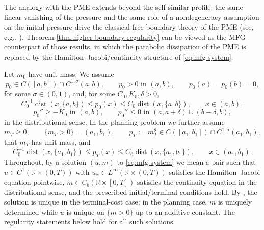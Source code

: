 \documentclass[11pt]{amsart}
\newcommand{\R}{\mathbb R}
\begin{document}
The analogy with the PME extends beyond the self-similar profile: the
same linear vanishing of the pressure and the same role of a nondegeneracy
assumption on the initial pressure drive the classical free boundary
theory of the PME (see, e.g., \cite{CF79,DH98,KKV18,Vazquez}). Theorem
\ref{thm:higher-boundary-regularity} can be viewed as the MFG
counterpart of those results, in which the parabolic dissipation of the
PME is replaced by the Hamilton--Jacobi/continuity structure of
\eqref{eq:mfg-system}.

Let \(m_0\) have unit mass. We assume
\begin{equation}
\label{ass:initial-data}
        p_0\in C([a,b])\cap C^{1,\sigma}(a,b),\qquad
        p_0>0\text{ in }(a,b),\qquad
        p_0(a)=p_0(b)=0,
\end{equation}
for some \(\sigma\in(0,1)\), and, for some \(C_0,K_0,\delta>0\),
\begin{equation}
\label{ass:nondegenerate}
        C_0^{-1}\operatorname{dist}(x,\{a,b\})
        \le p_0(x)\le
        C_0\operatorname{dist}(x,\{a,b\}),
        \qquad x\in(a,b),
\end{equation}
\begin{equation}
\label{ass:h-second}
        p_0''\ge -K_0\text{ in }(a,b),\qquad
        p_0''\le0\text{ in }(a,a+\delta)\cup(b-\delta,b),
\end{equation}
in the distributional sense. In the planning problem we further assume
\begin{equation}
\label{ass:planning-basic}
        m_T\ge0,\qquad \{m_T>0\}=(a_1,b_1),\qquad
        p_T:=m_T^\theta\in
        C([a_1,b_1])\cap C^{1,\sigma}(a_1,b_1),
\end{equation}
that \(m_T\) has unit mass, and
\begin{equation}
\label{ass:terminal-data}
        C_0^{-1}\operatorname{dist}(x,\{a_1,b_1\})
        \le p_T(x)\le
        C_0\operatorname{dist}(x,\{a_1,b_1\}),
        \qquad x\in(a_1,b_1).
\end{equation}
Throughout, by a solution \((u,m)\) to \eqref{eq:mfg-system} we mean a pair
such that \(u\in C^1(\R\times(0,T))\) with \(u_x\in L^\infty(\R\times(0,T))\)
satisfies the Hamilton--Jacobi equation pointwise, \(m\in C_b(\R\times[0,T])\)
satisfies the continuity equation in the distributional sense, and the
prescribed initial/terminal conditions hold. By
\cite[Thm.~4.3]{CMP}, the solution is unique in the terminal-cost case;
in the planning case, \(m\) is uniquely determined while \(u\) is unique
on \(\{m>0\}\) up to an additive constant. The regularity statements
below hold for all such solutions.
\end{document}
